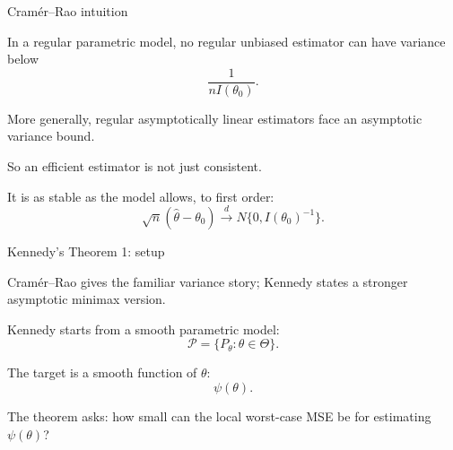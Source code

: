\documentclass[xcolor={table}, handout]{beamer}
\begin{document}
\note{
\scriptsize \singlespacing

}
\begin{frame}{Cram\'er--Rao intuition}

\begin{wideitemize}
\item In a regular parametric model, no regular unbiased estimator can have variance below
\[
\frac{1}{n I(\theta_0)}.
\]\pause
\item More generally, regular asymptotically linear estimators face an asymptotic variance bound.\pause
\item So an efficient estimator is not just consistent.\pause
\item It is as stable as the model allows, to first order:
\[
\sqrt{n}(\hat\theta-\theta_0)
  \overset{d}{\rightarrow}
  N\{0, I(\theta_0)^{-1}\}.
\]
\end{wideitemize}

\end{frame}

\note{
\scriptsize \singlespacing

}
\begin{frame}{Kennedy's Theorem 1: setup}

\small

\begin{wideitemize}
\item Cram\'er--Rao gives the familiar variance story; Kennedy states a stronger asymptotic minimax version.\pause
\item Kennedy starts from a smooth parametric model:
\[
\mathcal{P}=\{P_\theta:\theta\in\Theta\}.
\]\pause
\item The target is a smooth function of $\theta$:
\[
\psi(\theta).
\]\pause
\item The theorem asks: how small can the local worst-case MSE be for estimating $\psi(\theta)$?
\end{wideitemize}

\end{frame}
\end{document}

